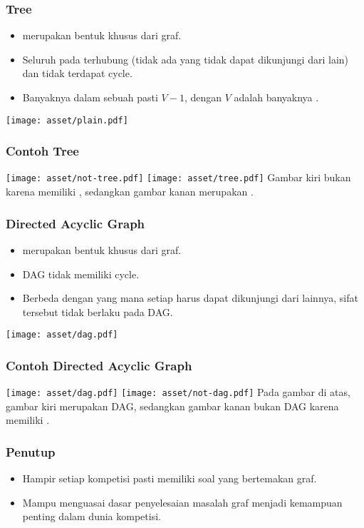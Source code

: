 \begin{frame}
\frametitle{Tree}
\begin{itemize}
  \item \fTree merupakan bentuk khusus dari graf.
  \item Seluruh \fnode pada \ftree terhubung (tidak ada \fnode yang tidak dapat dikunjungi dari \fnode lain) dan tidak terdapat \alert{cycle}.
  \item Banyaknya \fedge dalam sebuah \ftree pasti $V-1$, dengan $V$ adalah banyaknya \fnode.
\end{itemize}
\begin{center}
  \texttt{[image: asset/plain.pdf]}
\end{center}
\end{frame}

\begin{frame}
\frametitle{Contoh Tree}
\texttt{[image: asset/not-tree.pdf]}
\hspace{\fill}
\texttt{[image: asset/tree.pdf]}
\newline\newline
Gambar kiri bukan \ftree karena memiliki , sedangkan gambar kanan merupakan \ftree. 
\end{frame}

\begin{frame}
\frametitle{Directed Acyclic Graph}
\begin{itemize}
  \item {} merupakan bentuk khusus dari  graf.
  \item DAG tidak memiliki \alert{cycle}.
  \item Berbeda dengan \ftree yang mana setiap \fnode harus dapat dikunjungi dari \fnode lainnya, sifat tersebut tidak berlaku pada DAG.
\end{itemize}
\begin{center}
  \texttt{[image: asset/dag.pdf]}
\end{center}
\end{frame}

\begin{frame}
\frametitle{Contoh Directed Acyclic Graph}
\texttt{[image: asset/dag.pdf]}
\hspace{\fill}
\texttt{[image: asset/not-dag.pdf]}
\newline\newline
Pada gambar di atas, gambar kiri merupakan DAG, sedangkan gambar kanan bukan DAG karena memiliki .
\end{frame}

\begin{frame}
\frametitle{Penutup}
\begin{itemize}
  \item Hampir setiap kompetisi pasti memiliki soal yang bertemakan graf.
  \item Mampu menguasai dasar penyelesaian masalah graf menjadi kemampuan penting dalam dunia kompetisi.
\end{itemize}
\end{frame}


